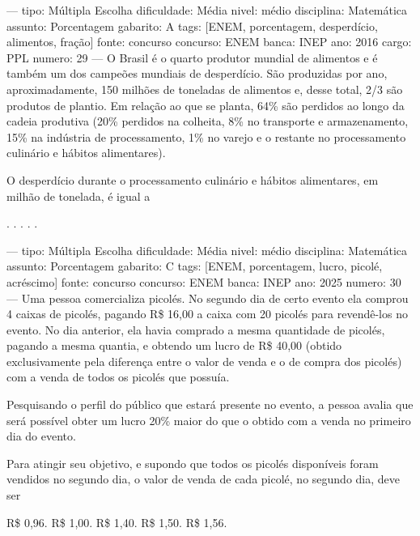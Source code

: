 ---
tipo: Múltipla Escolha
dificuldade: Média
nivel: médio
disciplina: Matemática
assunto: Porcentagem
gabarito: A
tags: [ENEM, porcentagem, desperdício, alimentos, fração]
fonte: concurso
concurso: ENEM
banca: INEP
ano: 2016
cargo: PPL
numero: 29
---
\question
O Brasil é o quarto produtor mundial de alimentos e é também um dos campeões mundiais de desperdício. São produzidas por ano, aproximadamente, 150 milhões de toneladas de alimentos e, desse total, 2/3 são produtos de plantio. Em relação ao que se planta, 64\% são perdidos ao longo da cadeia produtiva (20\% perdidos na colheita, 8\% no transporte e armazenamento, 15\% na indústria de processamento, 1\% no varejo e o restante no processamento culinário e hábitos alimentares).

O desperdício durante o processamento culinário e hábitos alimentares, em milhão de tonelada, é igual a
\begin{choices}
.
.
.
.
.
\end{choices}

---
tipo: Múltipla Escolha
dificuldade: Média
nivel: médio
disciplina: Matemática
assunto: Porcentagem
gabarito: C
tags: [ENEM, porcentagem, lucro, picolé, acréscimo]
fonte: concurso
concurso: ENEM
banca: INEP
ano: 2025
numero: 30
---
\question
Uma pessoa comercializa picolés. No segundo dia de certo evento ela comprou 4 caixas de picolés, pagando R\$ 16,00 a caixa com 20 picolés para revendê-los no evento. No dia anterior, ela havia comprado a mesma quantidade de picolés, pagando a mesma quantia, e obtendo um lucro de R\$ 40,00 (obtido exclusivamente pela diferença entre o valor de venda e o de compra dos picolés) com a venda de todos os picolés que possuía.

Pesquisando o perfil do público que estará presente no evento, a pessoa avalia que será possível obter um lucro 20\% maior do que o obtido com a venda no primeiro dia do evento.

Para atingir seu objetivo, e supondo que todos os picolés disponíveis foram vendidos no segundo dia, o valor de venda de cada picolé, no segundo dia, deve ser
\begin{choices}
\choice R\$ 0,96.
\choice R\$ 1,00.
\CorrectChoice R\$ 1,40.
\choice R\$ 1,50.
\choice R\$ 1,56.
\end{choices}
